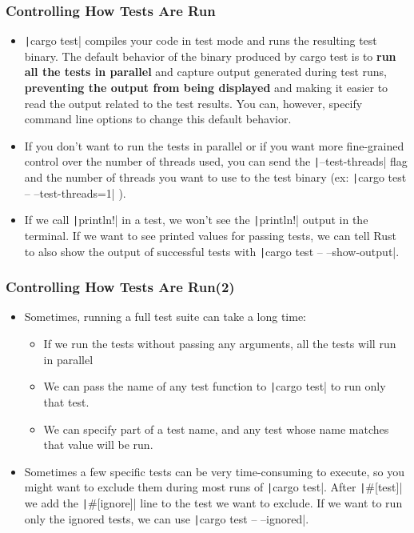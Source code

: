 \documentclass{beamer}
\begin{document}
\begin{frame}[fragile]
	\frametitle{Controlling How Tests Are Run}
	\begin{itemize}
		\item \texttt|cargo test| compiles your code in test mode and runs the resulting test binary. The default behavior of the binary produced by cargo test is to \textbf{run all the tests in parallel} and capture output generated during test runs,\textbf{ preventing the output from being displayed} and making it easier to read the output related to the test results. You can, however, specify command line options to change this default behavior.
		\item If you don’t want to run the tests in parallel or if you want more fine-grained control over the number of threads used, you can send the \texttt|--test-threads|  flag and the number of threads you want to use to the test binary (ex: \texttt|cargo test -- --test-threads=1| ).
		\item If we call \texttt|println!|  in a test, we won’t see the \texttt|println!| output in the terminal. If we want to see printed values for passing tests, we can tell Rust to also show the output of successful tests with \texttt|cargo test -- --show-output|.
	\end{itemize}
\end{frame}

\begin{frame}[fragile]
	\frametitle{Controlling How Tests Are Run(2)}
	\begin{itemize}
		\item Sometimes, running a full test suite can take a long time:
		\begin{itemize}
			\item If we run the tests without passing any arguments, all the tests will run in parallel
			\item 	We can pass the name of any test function to  \texttt|cargo test| to run only that test.
			\item 	We can specify part of a test name, and any test whose name matches that value will be run.
		\end{itemize}
		\item Sometimes a few specific tests can be very time-consuming to execute, so you might want to exclude them during most runs of \texttt|cargo test|. After  \texttt|#[test]| we add the  \texttt|#[ignore]| line to the test we want to exclude.   If we want to run only the ignored tests, we can use  \texttt|cargo test -- --ignored|.
		\inputminted[fontsize=\scriptsize]{rust}{./code/test8.rs}
	\end{itemize}
\end{frame}
\end{document}
